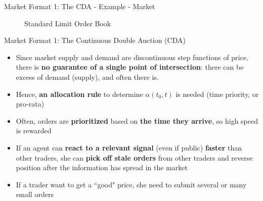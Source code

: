 \documentclass[10pt]{beamer}
\begin{document}
\begin{frame}{Market Format 1: The CDA - Example - Market}
    \begin{figure}[H]
        \centering
        \caption{Standard Limit Order Book}
    \end{figure}
\end{frame}

\begin{frame}{Market Format 1: The Continuous Double Auction (CDA)}
    \begin{itemize}
        \item Since market supply and demand are discontinuous step functions of price, there is \textbf{no guarantee of a single point of intersection}: there can be excess of demand (supply), and often there is. 
        \item Hence, \textbf{an allocation rule} to determine $\alpha(t_0, t)$ is needed (time priority, or pro-rata)
        \item Often, orders are \textbf{prioritized} based on \textbf{the time they arrive}, so high speed is rewarded
        \item If an agent can \textbf{react to a relevant signal} (even if public) \textbf{faster} than other traders, she can \textbf{pick off stale orders} from other traders and reverse position after the information has spread in the market
        \item If a trader want to get a ``good" price, she need to submit several or many small orders
    \end{itemize}
\end{frame}
\end{document}
